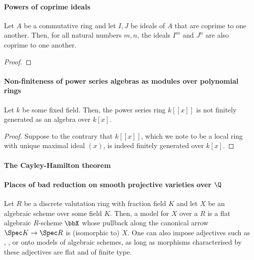     \paragraph{Powers of coprime ideals}
        \begin{proposition}
            Let $A$ be a commutative ring and let $I, J$ be ideals of $A$ that are coprime to one another. Then, for all natural numbers $m, n$, the ideals $I^m$ and $J^n$ are also coprime to one another. 
        \end{proposition}
            \begin{proof}
                
            \end{proof}
            
    \paragraph{Non-finiteness of power series algebras as modules over polynomial rings}
        \begin{proposition}
            Let $k$ be some fixed field. Then, the power series ring $k[[x]]$ is not finitely generated as an algebra over $k[x]$. 
        \end{proposition}
            \begin{proof}
                Suppose to the contrary that $k[[x]]$, which we note to be a local ring with unique maximal ideal $(x)$, is indeed finitely generated over $k[x]$. 
            \end{proof}
    
    \paragraph{The Cayley-Hamilton theorem}
    
    \paragraph{Places of bad reduction on smooth projective varieties over \texorpdfstring{$\Q$}{}}
        \begin{definition}[Models]
            Let $R$ be a discrete valutation ring with fraction field $K$ and let $X$ be an algebraic scheme over some field $K$. Then, a model for $X$ over a $R$ is a flat algebraic $R$-scheme $\bbX$ whose pullback along the canonical arrow $\Spec K \to \Spec R$ is (isomorphic to) $X$. One can also impose adjectives such as , , or  onto models of algebraic schemes, as long as morphisms characterised by these adjectives are flat and of finite type.
        \end{definition}
    
